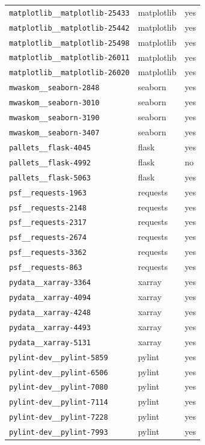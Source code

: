 \begin{longtable}{@{}p{}lp{}@{}}
\texttt{matplotlib\_\_matplotlib-25433} & matplotlib & yes \\
\texttt{matplotlib\_\_matplotlib-25442} & matplotlib & yes \\
\texttt{matplotlib\_\_matplotlib-25498} & matplotlib & yes \\
\texttt{matplotlib\_\_matplotlib-26011} & matplotlib & yes \\
\texttt{matplotlib\_\_matplotlib-26020} & matplotlib & yes \\
\texttt{mwaskom\_\_seaborn-2848} & seaborn & yes \\
\texttt{mwaskom\_\_seaborn-3010} & seaborn & yes \\
\texttt{mwaskom\_\_seaborn-3190} & seaborn & yes \\
\texttt{mwaskom\_\_seaborn-3407} & seaborn & yes \\
\texttt{pallets\_\_flask-4045} & flask & yes \\
\texttt{pallets\_\_flask-4992} & flask & no \\
\texttt{pallets\_\_flask-5063} & flask & yes \\
\texttt{psf\_\_requests-1963} & requests & yes \\
\texttt{psf\_\_requests-2148} & requests & yes \\
\texttt{psf\_\_requests-2317} & requests & yes \\
\texttt{psf\_\_requests-2674} & requests & yes \\
\texttt{psf\_\_requests-3362} & requests & yes \\
\texttt{psf\_\_requests-863} & requests & yes \\
\texttt{pydata\_\_xarray-3364} & xarray & yes \\
\texttt{pydata\_\_xarray-4094} & xarray & yes \\
\texttt{pydata\_\_xarray-4248} & xarray & yes \\
\texttt{pydata\_\_xarray-4493} & xarray & yes \\
\texttt{pydata\_\_xarray-5131} & xarray & yes \\
\texttt{pylint-dev\_\_pylint-5859} & pylint & yes \\
\texttt{pylint-dev\_\_pylint-6506} & pylint & yes \\
\texttt{pylint-dev\_\_pylint-7080} & pylint & yes \\
\texttt{pylint-dev\_\_pylint-7114} & pylint & yes \\
\texttt{pylint-dev\_\_pylint-7228} & pylint & yes \\
\texttt{pylint-dev\_\_pylint-7993} & pylint & yes \\

\end{longtable}
